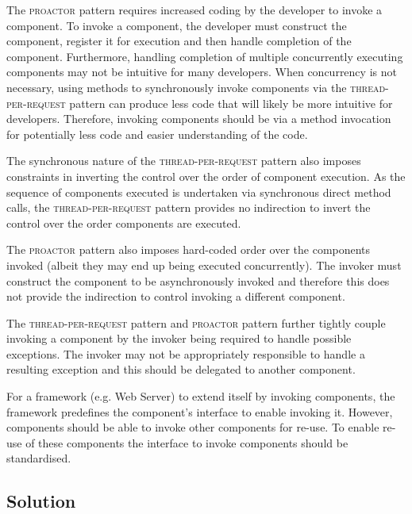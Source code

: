 \documentclass[prodmode]{style/acmlarge}
\begin{document}
The \textsc{proactor} pattern requires increased coding by the developer to
invoke a component.  To invoke a component, the developer must construct the
component, register it for execution and then handle completion of the
component.  Furthermore, handling completion of multiple concurrently executing
components may not be intuitive for many developers.  When concurrency is not
necessary, using methods to synchronously invoke components via the
\textsc{thread-per-request} pattern can produce less code that will likely be
more intuitive for developers.  Therefore, invoking components should be via a
method invocation for potentially less code and easier understanding of the
code.

The synchronous nature of the \textsc{thread-per-request} pattern also imposes
constraints in inverting the control over the order of component execution.  As
the sequence of components executed is undertaken via synchronous direct method
calls, the \textsc{thread-per-request} pattern provides no indirection to invert
the control over the order components are executed.

The \textsc{proactor} pattern also imposes hard-coded order over the components
invoked (albeit they may end up being executed concurrently).  The invoker must
construct the component to be asynchronously invoked and therefore this does not
provide the indirection to control invoking a different component.

The \textsc{thread-per-request} pattern and \textsc{proactor} pattern further
tightly couple invoking a component by the invoker being required to handle
possible exceptions.  The invoker may not be appropriately responsible to handle
a resulting exception and this should be delegated to another component.

For a framework (e.g. Web Server) to extend itself by invoking components, the
framework predefines the component's interface to enable invoking it.  However,
components should be able to invoke other components for re-use.  To enable
re-use of these components the interface to invoke components should be
standardised.


\subsection{Solution}

\end{document}
